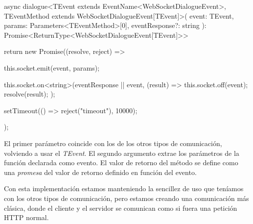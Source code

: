 \begin{mytypescript}[float={!h},caption={Implementación del método \textit{dialogue}.},label={alg:etiqueta}]
	async dialogue<TEvent extends EventName<WebSocketDialogueEvent>, TEventMethod extends WebSocketDialogueEvent[TEvent]>(
	event: TEvent,
	params: Parameters<TEventMethod>[0],
	eventResponse?: string
	): Promise<ReturnType<WebSocketDialogueEvent[TEvent]>> {
		return new Promise((resolve, reject) => {
			this.socket.emit(event, params);
																																																																																																						
			this.socket.on<string>(eventResponse || event, (result) => {
				this.socket.off(event);
				resolve(result);
			});
																																																																																																						
			setTimeout(() => reject("timeout"), 10000);
		});
	}
\end{mytypescript}

El primer parámetro coincide con los de los otros tipos de comunicación, volviendo a usar el \textit{TEvent}. El segundo argumento extrae los parámetros de la función declarada como evento. El valor de retorno del método se define como una \textit{promesa} del valor de retorno definido en función del evento.

Con esta implementación estamos manteniendo la sencillez de uso que teníamos con los otros tipos de comunicación, pero estamos creando una comunicación más clásica, donde el cliente y el servidor se comunican como si fuera una petición HTTP normal.
